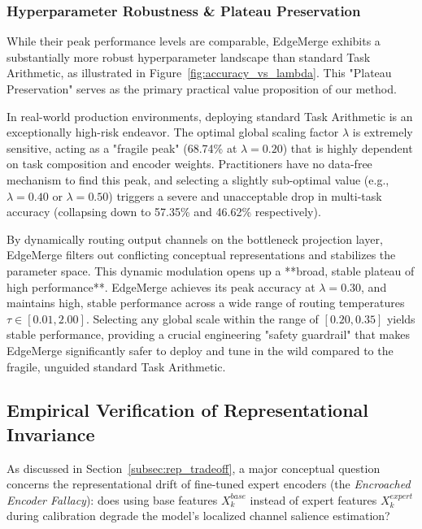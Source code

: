 \subsubsection{Hyperparameter Robustness \& Plateau Preservation}
\label{subsubsec:plateau}
While their peak performance levels are comparable, EdgeMerge exhibits a substantially more robust hyperparameter landscape than standard Task Arithmetic, as illustrated in Figure~\ref{fig:accuracy_vs_lambda}. This "Plateau Preservation" serves as the primary practical value proposition of our method.

In real-world production environments, deploying standard Task Arithmetic is an exceptionally high-risk endeavor. The optimal global scaling factor $\lambda$ is extremely sensitive, acting as a "fragile peak" (68.74\% at $\lambda = 0.20$) that is highly dependent on task composition and encoder weights. Practitioners have no data-free mechanism to find this peak, and selecting a slightly sub-optimal value (e.g., $\lambda = 0.40$ or $\lambda = 0.50$) triggers a severe and unacceptable drop in multi-task accuracy (collapsing down to 57.35\% and 46.62\% respectively).

By dynamically routing output channels on the bottleneck projection layer, EdgeMerge filters out conflicting conceptual representations and stabilizes the parameter space. This dynamic modulation opens up a **broad, stable plateau of high performance**. EdgeMerge achieves its peak accuracy at $\lambda = 0.30$, and maintains high, stable performance across a wide range of routing temperatures $\tau \in [0.01, 2.00]$. Selecting any global scale within the range of $[0.20, 0.35]$ yields stable performance, providing a crucial engineering "safety guardrail" that makes EdgeMerge significantly safer to deploy and tune in the wild compared to the fragile, unguided standard Task Arithmetic.

\subsection{Empirical Verification of Representational Invariance}
\label{subsec:empirical_verification}

As discussed in Section~\ref{subsec:rep_tradeoff}, a major conceptual question concerns the representational drift of fine-tuned expert encoders (the \emph{Encroached Encoder Fallacy}): does using base features $X_k^{base}$ instead of expert features $X_k^{expert}$ during calibration degrade the model's localized channel salience estimation?

